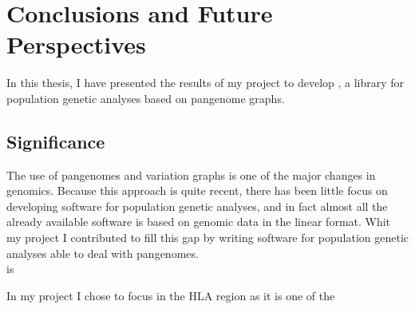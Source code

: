 
\chapter{Conclusions and Future Perspectives }%

\label{Chapter6} %




In this thesis, I have presented the results of my project to develop \vgp, a library for population genetic analyses based on pangenome graphs.


\section{Significance}
The use of pangenomes and variation graphs is one of the major changes in genomics. Because this approach is quite recent, there has been little focus on developing software for population genetic analyses, and in fact almost all the already available software is based on genomic data in the linear format. Whit my project I contributed to fill this gap by writing software for population genetic analyses able to deal with pangenomes. \\


\vgp is 


In my project I chose to focus in the HLA region as it is one of the 




